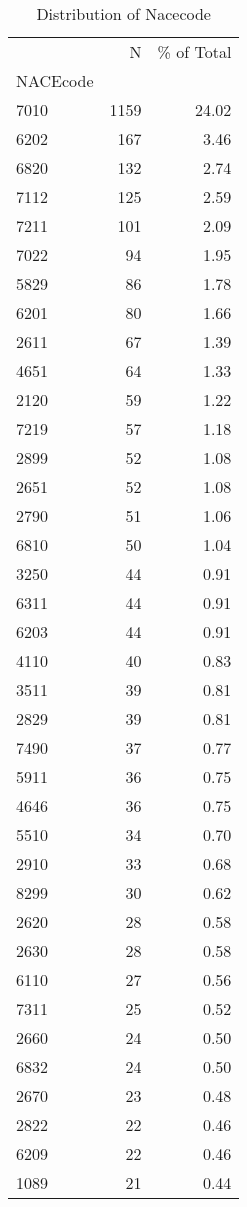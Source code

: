 \begin{table*}[htbp]
\centering
\small
\caption{Distribution of Nacecode}
\label{tab:dist_nacecode}
\begin{tabular}{lrr}
\toprule
 & N & \% of Total \\
NACEcode &  &  \\
\midrule
7010 & 1159 & 24.02 \\
6202 & 167 & 3.46 \\
6820 & 132 & 2.74 \\
7112 & 125 & 2.59 \\
7211 & 101 & 2.09 \\
7022 & 94 & 1.95 \\
5829 & 86 & 1.78 \\
6201 & 80 & 1.66 \\
2611 & 67 & 1.39 \\
4651 & 64 & 1.33 \\
2120 & 59 & 1.22 \\
7219 & 57 & 1.18 \\
2899 & 52 & 1.08 \\
2651 & 52 & 1.08 \\
2790 & 51 & 1.06 \\
6810 & 50 & 1.04 \\
3250 & 44 & 0.91 \\
6311 & 44 & 0.91 \\
6203 & 44 & 0.91 \\
4110 & 40 & 0.83 \\
3511 & 39 & 0.81 \\
2829 & 39 & 0.81 \\
7490 & 37 & 0.77 \\
5911 & 36 & 0.75 \\
4646 & 36 & 0.75 \\
5510 & 34 & 0.70 \\
2910 & 33 & 0.68 \\
8299 & 30 & 0.62 \\
2620 & 28 & 0.58 \\
2630 & 28 & 0.58 \\
6110 & 27 & 0.56 \\
7311 & 25 & 0.52 \\
2660 & 24 & 0.50 \\
6832 & 24 & 0.50 \\
2670 & 23 & 0.48 \\
2822 & 22 & 0.46 \\
6209 & 22 & 0.46 \\
1089 & 21 & 0.44 \\

\end{tabular}
\end{table*}
